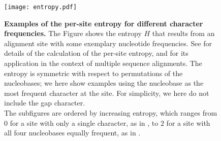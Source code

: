 \begin{figure}[thb!p]
    \centering
    \texttt{[image: entropy.pdf]}
    \begin{subfigure}{0pt}
        \label{fig:entropy:sub:a}
    \end{subfigure}
    \begin{subfigure}{0pt}
        \label{fig:entropy:sub:b}
    \end{subfigure}
    \begin{subfigure}{0pt}
        \label{fig:entropy:sub:c}
    \end{subfigure}
    \begin{subfigure}{0pt}
        \label{fig:entropy:sub:d}
    \end{subfigure}
    \begin{subfigure}{0pt}
        \label{fig:entropy:sub:e}
    \end{subfigure}
    \begin{subfigure}{0pt}
        \label{fig:entropy:sub:f}
    \end{subfigure}
    \begin{subfigure}{0pt}
        \label{fig:entropy:sub:g}
    \end{subfigure}
    \begin{subfigure}{0pt}
        \label{fig:entropy:sub:h}
    \end{subfigure}
    \caption[Examples of the per-site entropy for different character frequencies]{
        \textbf{Examples of the per-site entropy for different character frequencies.}
        The Figure shows the entropy $H$ that results from an alignment site with some exemplary nucleotide frequencies.
        See 
        for details of the calculation of the per-site entropy,
        and for its application in the context of multiple sequence alignments.
        The entropy is symmetric with respect to permutations of the nucleobases;
        we here show examples using the nucleobase  as the most frequent character at the site.
        For simplicity, we here do not include the gap character.
        \\
        The subfigures are ordered by increasing entropy,
        which ranges from $0$ for a site with only a single character, as in ,
        to $2$ for a site with all four nucleobases equally frequent, as in .
}
\end{figure}
